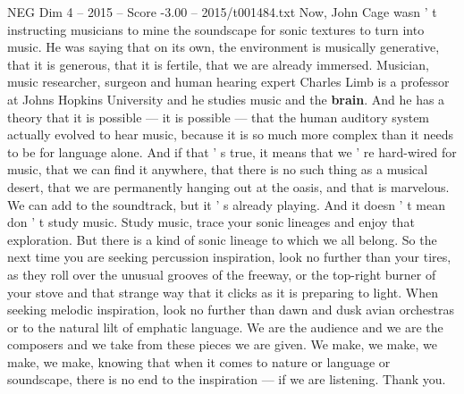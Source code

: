 \begin{textsample}{NEG Dim 4 – 2015 – Score -3.00 – 2015/t001484.txt}
Now, John Cage wasn ' t instructing musicians to mine the soundscape for sonic textures to turn into music.
He was saying that on its own, the environment is musically generative, that it is generous, that it is fertile, that we are already immersed.
Musician, music researcher, surgeon and human hearing expert Charles Limb is a professor at Johns Hopkins University and he studies music and the \textbf{brain}.
And he has a theory that it is possible — it is possible — that the human auditory system actually evolved to hear music, because it is so much more complex than it needs to be for language alone.
And if that ' s true, it means that we ' re hard-wired for music, that we can find it anywhere, that there is no such thing as a musical desert, that we are permanently hanging out at the oasis, and that is marvelous.
We can add to the soundtrack, but it ' s already playing.
And it doesn ' t mean don ' t study music.
Study music, trace your sonic lineages and enjoy that exploration.
But there is a kind of sonic lineage to which we all belong.
So the next time you are seeking percussion inspiration, look no further than your tires, as they roll over the unusual grooves of the freeway, or the top-right burner of your stove and that strange way that it clicks as it is preparing to light.
When seeking melodic inspiration, look no further than dawn and dusk avian orchestras or to the natural lilt of emphatic language.
We are the audience and we are the composers and we take from these pieces we are given.
We make, we make, we make, we make, knowing that when it comes to nature or language or soundscape, there is no end to the inspiration — if we are listening.
Thank you.

\end{textsample}
